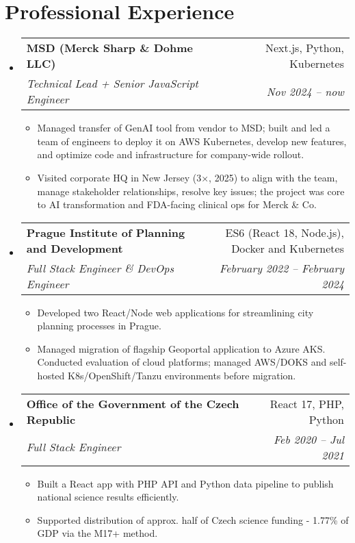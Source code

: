 \documentclass[letterpaper,11pt]{article}
\makeatletter
\newcommand{\sitem}[1]{\item #1 \vspace{-2pt}}
\newcommand{\resumeSubheading}[4]{
  \vspace{-1pt}\item
    \begin{tabular*}{0.97\textwidth}[t]{l@{\extracolsep{\fill}}r}
      \textbf{#1} & #2 \\
      \textit{\small#3} & \textit{\small #4} \\
    \end{tabular*}\vspace{-5pt}
}
\newenvironment{subheadingListing}{\begin{itemize}[leftmargin=*]}{\end{itemize}}
\newenvironment{resumeList}{\begin{itemize}}{\end{itemize}\vspace{-5pt}}
\makeatother
\begin{document}
\section{Professional Experience}
\begin{subheadingListing}
  \resumeSubheading
  {MSD (Merck Sharp \& Dohme LLC)}{Next.js, Python, Kubernetes}
  { Technical Lead + Senior JavaScript Engineer}{Nov 2024 – now}
  \begin{resumeList}
    \sitem{Managed transfer of GenAI tool from vendor to MSD; built and led a team of engineers to deploy it on AWS Kubernetes, develop new features, and optimize code and infrastructure for company-wide rollout.}
    \sitem{Visited corporate HQ in New Jersey (3×, 2025) to align with the team, manage stakeholder relationships, resolve key issues; the project was core to AI transformation and FDA-facing clinical ops for Merck \& Co.}
  \end{resumeList}

  \resumeSubheading
  {Prague Institute of Planning and Development}{ES6 (React 18, Node.js), Docker and Kubernetes}
  {Full Stack Engineer \& DevOps Engineer}{February 2022 – February 2024}
  \begin{resumeList}
    \sitem{Developed two React/Node web applications for streamlining city planning processes in Prague.}
    \sitem{Managed migration of flagship Geoportal application to Azure AKS. Conducted evaluation of cloud platforms; managed AWS/DOKS and self-hosted K8s/OpenShift/Tanzu environments before migration.}
  \end{resumeList}

  \resumeSubheading
    {Office of the Government of the Czech Republic}{React 17, PHP, Python}
    {Full Stack Engineer}{Feb 2020 – Jul 2021}
    \begin{resumeList}
      \sitem{Built a React app with PHP API and Python data pipeline to publish national science results efficiently.}
      \sitem{Supported distribution of approx. half of Czech science funding - 1.77\% of GDP via the M17+ method.}
    \end{resumeList}


\end{subheadingListing}
\end{document}

